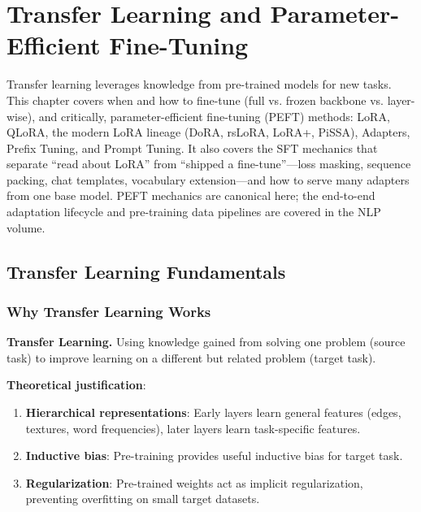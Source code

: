 \chapter{Transfer Learning and Parameter-Efficient Fine-Tuning}
\label{chap:transfer_learning}

\begin{tldr}
Transfer learning leverages knowledge from pre-trained models for new tasks. This chapter covers when and how to fine-tune (full vs. frozen backbone vs. layer-wise), and critically, parameter-efficient fine-tuning (PEFT) methods: LoRA, QLoRA, the modern LoRA lineage (DoRA, rsLoRA, LoRA+, PiSSA), Adapters, Prefix Tuning, and Prompt Tuning. It also covers the SFT mechanics that separate ``read about LoRA'' from ``shipped a fine-tune''---loss masking, sequence packing, chat templates, vocabulary extension---and how to serve many adapters from one base model. PEFT mechanics are canonical here; the end-to-end adaptation lifecycle and pre-training data pipelines are covered in the NLP volume.
\end{tldr}

\section{Transfer Learning Fundamentals}
\label{sec:transfer_fundamentals}

\subsection{Why Transfer Learning Works}

\textbf{Transfer Learning.} Using knowledge gained from solving one problem (source task) to improve learning on a different but related problem (target task).

\textbf{Theoretical justification}:
\begin{enumerate}
    \item \textbf{Hierarchical representations}: Early layers learn general features (edges, textures, word frequencies), later layers learn task-specific features.
    
    \item \textbf{Inductive bias}: Pre-training provides useful inductive bias for target task.
    
    \item \textbf{Regularization}: Pre-trained weights act as implicit regularization, preventing overfitting on small target datasets.
\end{enumerate}

